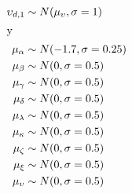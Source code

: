 \begin{align}
\upsilon_{d,1} &\sim N(\mu_{\upsilon}, \sigma=1) \nonumber \\
\intertext{y}
\mu_{\alpha} &\sim N(-1.7,\sigma=0.25) \nonumber \\
\mu_{\beta} &\sim N(0,\sigma=0.5) \nonumber \\
\mu_{\gamma} &\sim N(0,\sigma=0.5) \nonumber \\
\mu_{\delta} &\sim N(0,\sigma=0.5) \nonumber \\
\mu_{\lambda} &\sim N(0,\sigma=0.5) \nonumber \\
\mu_{\kappa} &\sim N(0,\sigma=0.5) \nonumber \\
\mu_{\zeta} &\sim N(0,\sigma=0.5) \nonumber \\
\mu_{\xi} &\sim N(0,\sigma=0.5) \nonumber \\
\mu_{\upsilon} &\sim N(0,\sigma=0.5) \nonumber
\end{align}